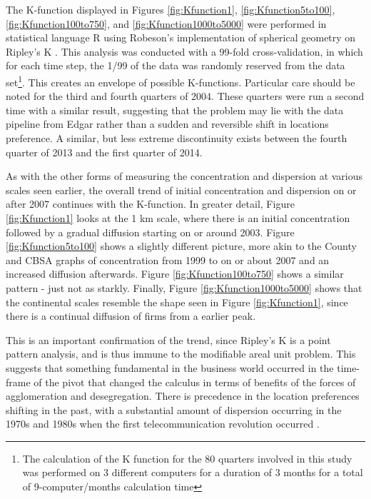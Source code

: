 The K-function displayed in Figures \ref{fig:Kfunction1}, \ref{fig:Kfunction5to100}, \ref{fig:Kfunction100to750}, and \ref{fig:Kfunction1000to5000} were performed in statistical language R using Robeson's implementation of spherical geometry on Ripley's K \citep{SphericalK}.  This analysis was conducted with a 99-fold cross-validation, in which for each time step, the 1/99 of the data was randomly reserved from the data set\footnote{The calculation of the K function for the 80 quarters involved in this study was performed on 3 different computers for a duration of 3 months for a total of 9-computer/months calculation time}.  This creates an envelope of possible K-functions. Particular care should be noted for the third and fourth quarters of 2004.  These quarters were run a second time with a similar result, suggesting that the problem may lie with the data pipeline from Edgar rather than a sudden and reversible shift in locations preference. A similar, but less extreme discontinuity exists between the fourth quarter of 2013 and the first quarter of 2014. 

As with the other forms of measuring the concentration and dispersion at various scales seen earlier, the overall trend of initial concentration and dispersion on or after 2007 continues with the K-function.  In greater detail, Figure \ref{fig:Kfunction1} looks at the 1 km scale, where there is an initial concentration followed by a gradual diffusion starting on or around 2003. Figure \ref{fig:Kfunction5to100} shows a slightly different picture, more akin to the County and CBSA graphs of concentration from 1999 to on or about 2007 and an increased diffusion afterwards.  Figure \ref{fig:Kfunction100to750} shows a similar pattern - just not as starkly.  Finally, Figure \ref{fig:Kfunction1000to5000} shows that the continental scales resemble the shape seen in Figure \ref{fig:Kfunction1}, since there is a continual diffusion of firms from a earlier peak.  

This is an important confirmation of the trend, since Ripley's K is a point pattern analysis, and is thus immune to the  modifiable areal unit problem.  This suggests that something fundamental in the business world occurred in the time-frame of the pivot that changed the calculus in terms of benefits of the forces of agglomeration and desegregation.  There is precedence in the location preferences shifting in the past, with a substantial amount of dispersion occurring in the 1970s and 1980s when the first telecommunication revolution occurred \citep{bodenmanfirm2000}.

